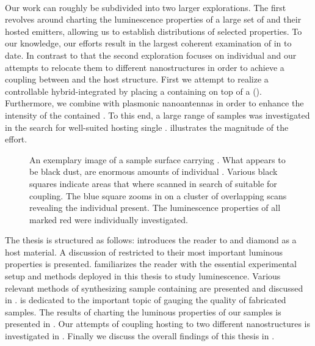 	\\
   	Our work can roughly be subdivided into two larger explorations. The first revolves around charting the luminescence properties of a large set of \nds and their hosted emitters, allowing us to establish distributions of selected \siv properties. To our knowledge, our efforts result in the largest coherent examination of \sivs in \nds to date. In contrast to that the second exploration focuses on individual \nds and our attempts to relocate them to different nanostructures in order to achieve a coupling between \sivs and the host structure. First we attempt to realize a controllable hybrid-integrated \sps by placing a \nd containing \sivs on top of a \vcsel (\VCSEL). Furthermore, we combine \nds with plasmonic nanoantennas in order to enhance the \pl intensity of the contained \sivs.
   	To this end, a large range of samples was investigated in the search for well-suited \nds hosting single \sivs.  illustrates the magnitude of the effort.

   	\begin{figure}[!htb]
   		\centering
   		\caption[An enormous amount of \nds visible on a sample]{An exemplary image of a sample surface carrying \nds. What appears to be black dust, are enormous amounts of individual \nds. Various black squares indicate areas that where scanned in search of \nds suitable for coupling. The blue square zooms in on a cluster of overlapping scans revealing the individual \nds present. The luminescence properties of all \nds marked red were individually investigated.}
   		\label{fig::milky_way1}
   	\end{figure}

	The thesis is structured as follows:  introduces the reader to \ccs and diamond as a host material. A discussion of \sivs restricted to their most important luminous properties is presented.  familiarizes the reader with the essential experimental setup and methods deployed in this thesis to study \siv luminescence. Various relevant methods of synthesizing sample \nds containing \sivs are presented and discussed in .  is dedicated to the important topic of gauging the quality of fabricated samples. The results of charting the luminous properties of our \nds samples is presented in . Our attempts of coupling \nds hosting \sivs to two different nanostructures is investigated in . Finally we discuss the overall findings of this thesis in .
